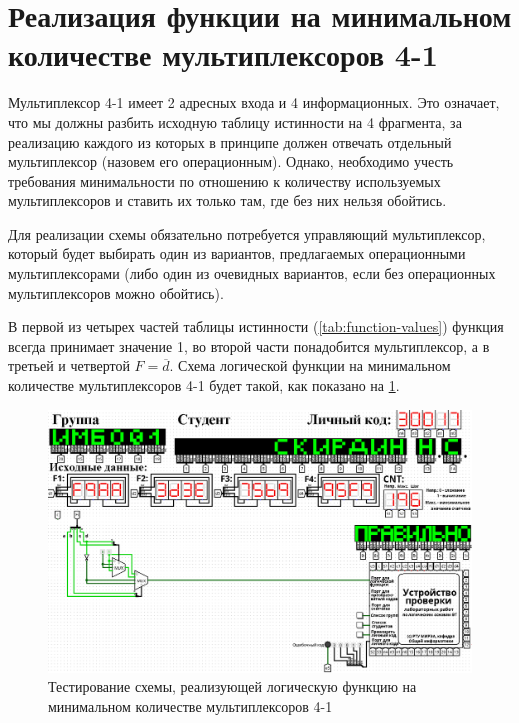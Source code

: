 \documentclass[14pt, a4paper]{extreport}
\begin{document}
\section{Реализация функции на минимальном количестве мультиплексоров 4-1}
Мультиплексор 4-1 имеет 2 адресных входа и 4 информационных. Это означает, что мы должны разбить исходную таблицу истинности на 4 фрагмента, за реализацию каждого из которых в принципе должен отвечать отдельный мультиплексор (назовем его операционным). Однако, необходимо учесть требования минимальности по отношению к количеству используемых мультиплексоров и ставить их только там, где без них нельзя обойтись.

Для реализации схемы обязательно потребуется управляющий мультиплексор, который будет выбирать один из вариантов, предлагаемых операционными мультиплексорами (либо один из очевидных вариантов, если без операционных мультиплексоров можно обойтись).

В первой из четырех частей таблицы истинности (\cref{tab:function-values}) функция всегда принимает значение 1, во второй части понадобится мультиплексор, а в третьей и четвертой $F = \overline{d}$. Схема логической функции на минимальном количестве мультиплексоров 4-1 будет такой, как показано на \cref{fig:multiplexer-4-1}.

\begin{figure}[H]
	\caption{Тестирование схемы, реализующей логическую функцию на минимальном количестве мультиплексоров 4-1}
	\label{fig:multiplexer-4-1}
	\includegraphics[width=\textwidth]{multiplexer-4-1}
\end{figure}
\end{document}
